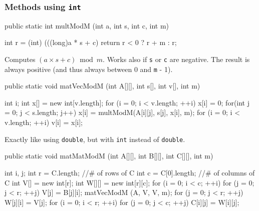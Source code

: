 \subsubsection* {Methods using \texttt{int}}
\begin{code}

   public static int multModM (int a, int s, int c, int m) \begin{hide} {
      int r = (int) (((long)a * s + c) %
      return r < 0 ? r + m : r;
   } \end{hide}
\end{code}
\begin{tabb} Computes $(a \times s + c) 
  \bmod m$. Works also if \texttt{s} 
  or \texttt{c} are negative.
  The result is always positive (and thus always between 0 and \texttt{m} - 1).
\end{tabb}
\begin{htmlonly}
\end{htmlonly}
\begin{code}

   public static void matVecModM (int A[][], int s[], int v[], int m) \begin{hide} {
      int i;
      int x[] = new int[v.length];
      for (i = 0; i < v.length;  ++i) {
         x[i] = 0;
         for(int j = 0; j < s.length; j++)
            x[i] = multModM(A[i][j], s[j], x[i], m);
      }
      for (i = 0; i < v.length;  ++i)
         v[i] = x[i];

   } \end{hide}
\end{code}
\begin{tabb} Exactly like  using \texttt{double}, but with \texttt{int} instead 
  of \texttt{double}.
\end{tabb}
\begin{htmlonly}
\end{htmlonly}
\begin{code}

   public static void matMatModM (int A[][], int B[][], int C[][], int m) \begin{hide} {
      int i, j;
      int r = C.length;    //# of rows of C
      int c = C[0].length; //# of columns of C
      int V[] = new int[r];
      int W[][] = new int[r][c];
      for (i = 0; i < c;  ++i) {
         for (j = 0; j < r;  ++j)
            V[j] = B[j][i];
         matVecModM (A, V, V, m);
         for (j = 0; j < r;  ++j)
            W[j][i] = V[j];
      }
      for (i = 0; i < r;  ++i) {
         for (j = 0; j < c;  ++j)
            C[i][j] = W[i][j];
      }
   } \end{hide}
\end{code}

